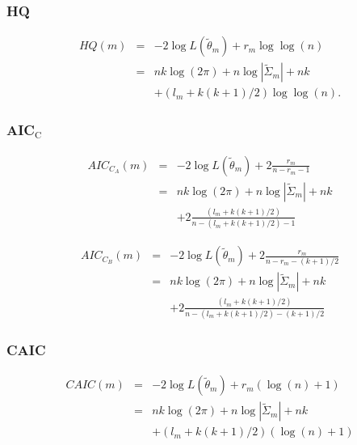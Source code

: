 \subsubsection{HQ}

\begin{eqnarray*}
HQ\left(m\right) & = & -2\log L\left(\widetilde{\theta}_{m}\right)+r_{m}\log\log\left(n\right)\\
 & = & nk\log\left(2\pi\right)+n\log\left\vert \widetilde{\Sigma}_{m}\right\vert +nk\\
 &  & +\left(l_{m}+k\left(k+1\right)/2\right)\log\log\left(n\right).
\end{eqnarray*}



\subsubsection{AIC$_{\text{C}}$}

\begin{eqnarray*}
AIC_{C_{A}}\left(m\right) & = & -2\log L\left(\widetilde{\theta}_{m}\right)+2\frac{r_{m}}{n-r_{m}-1}\\
 & = & nk\log\left(2\pi\right)+n\log\left\vert \widetilde{\Sigma}_{m}\right\vert +nk\\
 &  & +2\frac{\left(l_{m}+k\left(k+1\right)/2\right)}{n-\left(l_{m}+k\left(k+1\right)/2\right)-1}
\end{eqnarray*}


\begin{eqnarray*}
AIC_{C_{B}}\left(m\right) & = & -2\log L\left(\widetilde{\theta}_{m}\right)+2\frac{r_{m}}{n-r_{m}-(k+1)/2}\\
 & = & nk\log\left(2\pi\right)+n\log\left\vert \widetilde{\Sigma}_{m}\right\vert +nk\\
 &  & +2\frac{\left(l_{m}+k\left(k+1\right)/2\right)}{n-\left(l_{m}+k\left(k+1\right)/2\right)-\left(k+1\right)/2}
\end{eqnarray*}



\subsubsection{CAIC}

\begin{eqnarray*}
CAIC\left(m\right) & = & -2\log L\left(\widetilde{\theta}_{m}\right)+r_{m}\left(\log\left(n\right)+1\right)\\
 & = & nk\log\left(2\pi\right)+n\log\left\vert \widetilde{\Sigma}_{m}\right\vert +nk\\
 &  & +\left(l_{m}+k\left(k+1\right)/2\right)\left(\log\left(n\right)+1\right)
\end{eqnarray*}



